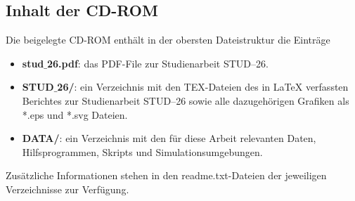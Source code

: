 \begin{appendix}
\pagebreak
\section{Inhalt der CD-ROM}
%
%
Die beigelegte CD-ROM enthält in der obersten Dateistruktur die Einträge
\begin{itemize}
	\item \textbf{stud$\_${26}.pdf}: das PDF-File zur Studienarbeit
	STUD--{26}.
	\item \textbf{STUD$\_${26}/}: ein Verzeichnis mit den TEX-Dateien des in
	LaTeX verfassten Berichtes zur Studienarbeit STUD--{26} sowie alle
	dazugehörigen Grafiken als *.eps und *.svg Dateien.
	\item \textbf{DATA/}: ein Verzeichnis mit den für diese Arbeit
	relevanten Daten, Hilfsprogrammen, Skripts und Simulationsumgebungen.
\end{itemize} 
Zusätzliche Informationen stehen in den readme.txt-Dateien der
jeweiligen Verzeichnisse zur Verfügung.

\end{appendix}
